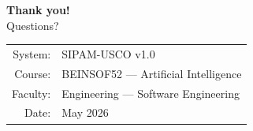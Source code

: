 \documentclass[aspectratio=169,12pt]{beamer}
\begin{document}
\begin{frame}[plain]
  \vspace{1.2cm}
  \centering
  {\color{white}\Huge\bfseries Thank you!}\\[0.6cm]
  {\color{ocre}\large Questions?}\\[0.8cm]
  \begin{tabular}{rl}
    {\color{white}\small System:}  & {\color{ocre}\small SIPAM-USCO v1.0} \\
    {\color{white}\small Course:}  & {\color{ocre}\small BEINSOF52 — Artificial Intelligence} \\
    {\color{white}\small Faculty:} & {\color{ocre}\small Engineering — Software Engineering} \\
    {\color{white}\small Date:}    & {\color{ocre}\small May 2026} \\
  \end{tabular}
\end{frame}
\end{document}
